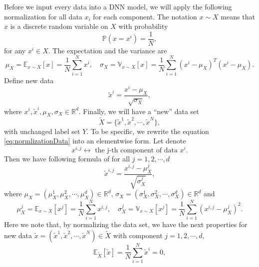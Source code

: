 Before we input every data into a DNN model, we will apply the following normalization
for all data $x_i$ for each component. The notation $x \sim X$ means that $x$ is a discrete random variable on $X$
with probability
\begin{equation}\label{key}
\mathbb P( x = x^i ) = \frac{1}{N},
\end{equation}
for any $x^i \in X$. The expectation and the variance are 
\begin{equation}\label{key}
\mu_X =\mathbb{E}_{x \sim X}[x] = \frac{1}{N}\sum_{i=1}^N x^i, 
\quad  \sigma_X= \mathbb{V}_{x\sim X}[x] = \frac{1}{N} \sum_{i=1}^N ( x^i - \mu_X)^T( x^i - \mu_X).
\end{equation}
Define new data
\begin{equation}\label{eq:normlizationData}
\tilde x^i = \frac{x^i - \mu_X }{\sqrt{\sigma_X}},
\end{equation}
where 
$
x^i , \tilde x^i , \mu_X, \sigma_X \in \mathbb{R}^d.
$
Finally, we will have a ``new'' data set 
\begin{equation}\label{key}
\tilde X = \{\tilde x^1, \tilde x^2, \cdots, \tilde x^N \},
\end{equation}
with unchanged label set $Y$. 
To be specific, we rewrite the equation \eqref{eq:normlizationData} into an elementwise form. 
Let denote
\begin{equation}\label{key}
x^{i,j} \longleftrightarrow \text{ the j-th component of data } x^i.
\end{equation}
Then we have following formula of for all $j = 1, 2, \cdots, d$
\begin{equation}\label{key}
\tilde x^{i,j}  = \frac{x^{i,j} - \mu_X^j }{\sqrt{\sigma_X^j}},
\end{equation}
where $\mu_X=(\mu_X^1,\mu_X^2,\cdots, \mu_X^d)\in \mathbb{R}^d$, $\sigma_X=(\sigma_X^1,\sigma_X^2,\cdots, \sigma_X^d)\in \mathbb{R}^d$ and
\begin{equation}\label{key}
\mu_X^j =\mathbb{E}_{x \sim X}[x^j] = \frac{1}{N}\sum_{i=1}^N x^{i,j}, 
\quad  \sigma_X^j = \mathbb{V}_{x\sim X}[x^j] = \frac{1}{N} \sum_{i=1}^N ( x^{i,j} - \mu_X^j)^2.
\end{equation}
Here we note that, by normalizing the data set, we have the next properties 
for new data $\tilde x=(\tilde x^1, \tilde x^2, \cdots, \tilde x^N) \in \tilde X$ with component $j = 1,2,\cdots,d$,
\begin{equation}\label{key}
\mathbb{E}_{\tilde X}[\tilde x] = \frac{1}{N} \sum_{i=1}^N \tilde x^i = 0, 
\end{equation}
